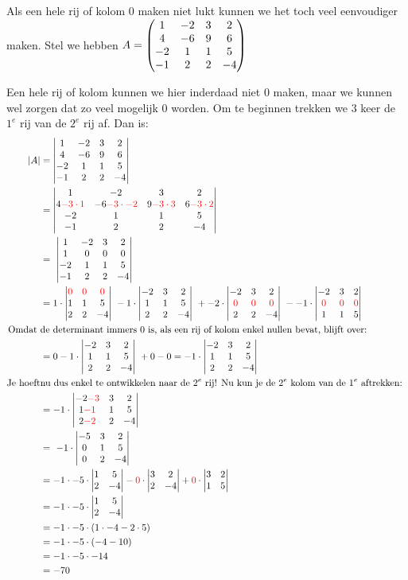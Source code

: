 \newpage

Als een hele rij of kolom $0$ maken niet lukt kunnen we het toch veel eenvoudiger maken. Stel we hebben 
$A = \begin{pmatrix} 1 & -2 & 3 & 2 \\ 4 & -6 & 9 & 6 \\ -2 & 1 & 1 & 5 \\ -1 & 2 & 2 & -4 \end{pmatrix} $ 

Een hele rij of kolom kunnen we hier inderdaad niet $0$ maken, maar we kunnen wel zorgen dat zo veel mogelijk $0$ worden. Om te beginnen trekken we $3$ keer de $1^e$ rij van de $2^e$ rij af. Dan is:
\begin{align*}
	|A| & = \detvier{1 & -2 & 3 & 2 }{ 4 & -6 & 9 & 6  }{  -2 & 1 & 1 & 5 }{ -1 & 2 & 2 & -4 } \\
        & = \detvier{1 & -2 & 3 & 2 }
                    { 4\red{-3\cdot1} & -6\red{-3\cdot-2} & 9\red{-3\cdot3} & 6\red{-3\cdot2}  }
	              {  -2 & 1 & 1 & 5 }
	              { -1 & 2 & 2 & -4 } \\
	  & = \ \detvier{1 & -2 & 3 & 2  }{ 1 & 0 &  0 & 0 }{  -2 & 1 & 1 & 5 }{ -1 & 2 & 2 & -4 } \\%
	   & = 1\cdot \detdrie{ \red{0} & \red{0} & \red{0} }{1 & 1 & 5 }{ 2 & 2 & -4 }\ 
        -1\cdot  \detdrie{ -2 & 3 & 2 }{1 & 1 & 5 }{ 2 & 2 & -4 }\ %
        +-2\cdot \detdrie{ -2 & 3 & 2 }{\red{0} & \red{0} & \red{0} }{ 2 & 2 & -4 }\ 
        --1\cdot \detdrie{ -2 & 3 & 2 }{\red{0} & \red{0} & \red{0} }{ 1 & 1 & 5 } \\
 \text{Omdat }  & \text{de determinant immers $0$ is, als een rij of kolom enkel nullen bevat, blijft over: } \\
        &= 0 -1\cdot  \detdrie{ -2 & 3 & 2 }{1 & 1 & 5 }{ 2 & 2 & -4 }\ + 0 - 0 = -1\cdot  \detdrie{ -2 & 3 & 2 }{1 & 1 & 5 }{ 2 & 2 & -4 } \\
\text{Je hoeft} & \text{nu dus enkel te ontwikkelen naar de } 2^e \text{ rij! Nu kun je de } 2^e \text{ kolom van de } 1^e \text{ aftrekken: } \\ 
        &= -1\cdot  \detdrie{ -2 \red{-3} & 3 & 2 }{1 \red{-1} & 1 & 5 }{ 2\red{-2} & 2 & -4 }\\
        &= \ -1\cdot \detdrie{ -5 & 3 & 2 }{0 & 1 & 5 }{ 0 & 2 & -4 }\ \\ 
        &= -1\cdot -5\cdot \dettwee{1&5}{2&-4} - \red{0}\cdot \dettwee{3&2}{2&-4} + \red{0}\cdot\dettwee{3&2}{1&5}\\
        &= -1\cdot -5\cdot \dettwee{1&5}{2&-4}\\
        &= -1\cdot -5\cdot (1\cdot -4 -2\cdot 5) \\
        &= -1\cdot -5\cdot (-4 -10) \\
        &= -1\cdot -5\cdot -14 \\
        &= -70 \\
\end{align*}

